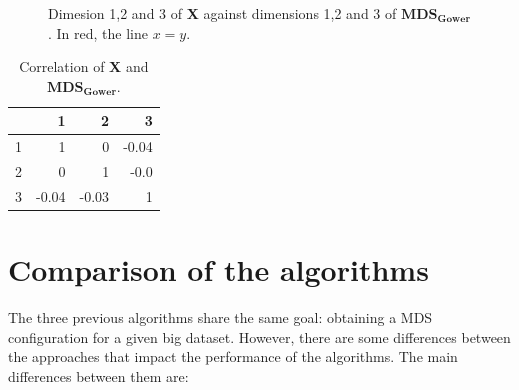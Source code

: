 \documentclass[11pt]{report}
\begin{document}
\begin{figure}[ht]
    \centering
    \caption{Dimesion 1,2 and 3 of \textbf{X} against dimensions 1,2 and 3 of  $\mathbf{MDS_{Gower}}$. \newline
            In red, the line $x=y$.}%
    \label{gower_example}%
\end{figure}


\begin{table}[ht]
\centering
\begin{tabular}{rrrr}
  \hline
 & 1 & 2 & 3 \\ 
  \hline
  1 & 1 & 0 & -0.04 \\ 
  2 & 0 & 1 & -0.0 \\ 
  3 & -0.04 & -0.03 & 1 \\ 
   \hline
\end{tabular}
\caption{Correlation of \textbf{X} and $\mathbf{MDS_{Gower}}$.} 
\label{corr_gower}
\end{table}


\section{Comparison of the algorithms}
\indent The three previous algorithms share the same goal: obtaining a MDS 
configuration for a given big dataset. However, there are some differences 
between the approaches that impact the performance of the algorithms. 
The main differences between them are:
\end{document}

